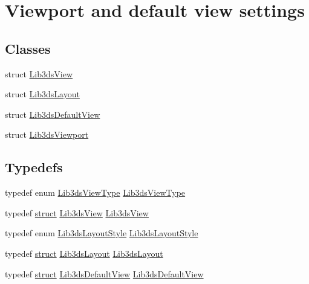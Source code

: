 \hypertarget{group__viewport}{\section{Viewport and default view settings}
\label{group__viewport}
}
\subsection*{Classes}
\begin{DoxyCompactItemize}
\item 
struct \hyperlink{struct_lib3ds_view}{Lib3ds\-View}
\item 
struct \hyperlink{struct_lib3ds_layout}{Lib3ds\-Layout}
\item 
struct \hyperlink{struct_lib3ds_default_view}{Lib3ds\-Default\-View}
\item 
struct \hyperlink{struct_lib3ds_viewport}{Lib3ds\-Viewport}
\end{DoxyCompactItemize}
\subsection*{Typedefs}
\begin{DoxyCompactItemize}
\item 
typedef enum \hyperlink{group__viewport_ga87cb58d3ca8782c6384c08c0db775636}{Lib3ds\-View\-Type} \hyperlink{group__viewport_gaaf7d4a89ae651ff0ff9322cb6cfdf939}{Lib3ds\-View\-Type}
\item 
typedef \hyperlink{sdlgamepad_8dox_aba655c5729da86df745f0c8e7f9ba8d2}{struct} \hyperlink{struct_lib3ds_view}{Lib3ds\-View} \hyperlink{group__viewport_gad027e884ea1809c063af7dd0b8adf5f8}{Lib3ds\-View}
\item 
typedef enum \hyperlink{group__viewport_ga8988e271ccec7ae44750514209e2ac66}{Lib3ds\-Layout\-Style} \hyperlink{group__viewport_gab32fe00e2b725f343756fe4467d2353f}{Lib3ds\-Layout\-Style}
\item 
typedef \hyperlink{sdlgamepad_8dox_aba655c5729da86df745f0c8e7f9ba8d2}{struct} \hyperlink{struct_lib3ds_layout}{Lib3ds\-Layout} \hyperlink{group__viewport_ga6df4ae34e2ea747eee605a40b4345d29}{Lib3ds\-Layout}
\item 
typedef \hyperlink{sdlgamepad_8dox_aba655c5729da86df745f0c8e7f9ba8d2}{struct} \hyperlink{struct_lib3ds_default_view}{Lib3ds\-Default\-View} \hyperlink{group__viewport_ga1f527b7aa29d4741708769ac19bcd8a0}{Lib3ds\-Default\-View}
\end{DoxyCompactItemize}
